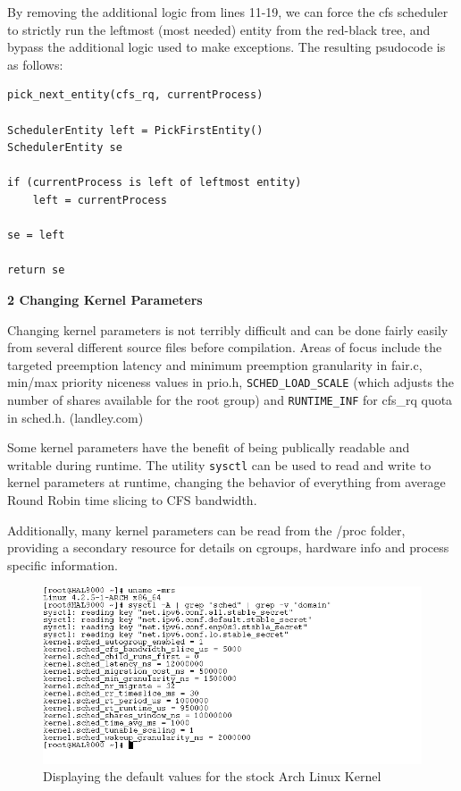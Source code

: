 By removing the additional logic from lines 11-19, we can force the cfs scheduler to strictly run the leftmost (most needed) entity from the red-black tree, and bypass the additional logic used to make exceptions. The resulting psudocode is as follows:

\begin{lstlisting}
pick_next_entity(cfs_rq, currentProcess)

SchedulerEntity left = PickFirstEntity()
SchedulerEntity se

if (currentProcess is left of leftmost entity)
	left = currentProcess

se = left

return se
\end{lstlisting}

\vspace{1pc}

\noindent\textbf{2 Changing Kernel Parameters}
\vspace{1pc}

Changing kernel parameters is not terribly difficult and can be done fairly easily from several different source files before compilation. Areas of focus include the targeted preemption latency and minimum preemption granularity in fair.c, min/max priority niceness values in prio.h, \texttt{SCHED\_LOAD\_SCALE} (which adjusts the number of shares available for the root group) and \texttt{RUNTIME\_INF} for cfs\_rq quota in sched.h. (landley.com)

Some kernel parameters have the benefit of being publically readable and  writable during runtime. The utility \texttt{sysctl} can be used to read and write to kernel parameters at runtime, changing the behavior of everything from average Round Robin time slicing to CFS bandwidth.

Additionally, many kernel parameters can be read from the /proc folder, providing a secondary resource for details on cgroups, hardware info and process specific information.

\begin{figure}[hb]
	\includegraphics[width=1.0\columnwidth]{sysctl}
	\caption{Displaying the default values for the stock Arch Linux Kernel}
\end{figure}

